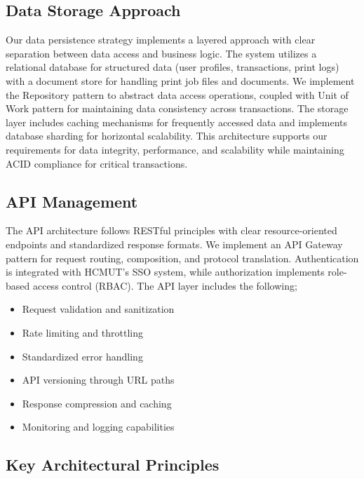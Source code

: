 \subsection{Data Storage Approach} 

Our data persistence strategy implements a layered approach with clear separation between data access and business logic. The system utilizes a relational database for structured data (user profiles, transactions, print logs) with a document store for handling print job files and documents. We implement the Repository pattern to abstract data access operations, coupled with Unit of Work pattern for maintaining data consistency across transactions. The storage layer includes caching mechanisms for frequently accessed data and implements database sharding for horizontal scalability. This architecture supports our requirements for data integrity, performance, and scalability while maintaining ACID compliance for critical transactions.

\subsection{API Management} 

The API architecture follows RESTful principles with clear resource-oriented endpoints and standardized response formats. We implement an API Gateway pattern for request routing, composition, and protocol translation. Authentication is integrated with HCMUT's SSO system, while authorization implements role-based access control (RBAC). The API layer includes the following;

\begin{multicols}{2}    
\begin{itemize}
    \item Request validation and sanitization
    \item Rate limiting and throttling
    \item Standardized error handling
    \item API versioning through URL paths
    \item Response compression and caching
    \item Monitoring and logging capabilities
\end{itemize}
\end{multicols}

\subsection{Key Architectural Principles}

